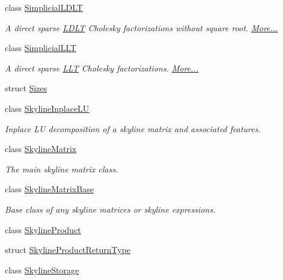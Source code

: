 \begin{DoxyCompactItemize}
class \hyperlink{group___sparse_cholesky___module_class_eigen_1_1_simplicial_l_d_l_t}{Simplicial\+L\+D\+LT}
\begin{DoxyCompactList}\small\item\em A direct sparse \hyperlink{group___cholesky___module_class_eigen_1_1_l_d_l_t}{L\+D\+LT} Cholesky factorizations without square root.  \hyperlink{group___sparse_cholesky___module_class_eigen_1_1_simplicial_l_d_l_t}{More...}\end{DoxyCompactList}\item 
class \hyperlink{group___sparse_cholesky___module_class_eigen_1_1_simplicial_l_l_t}{Simplicial\+L\+LT}
\begin{DoxyCompactList}\small\item\em A direct sparse \hyperlink{group___cholesky___module_class_eigen_1_1_l_l_t}{L\+LT} Cholesky factorizations.  \hyperlink{group___sparse_cholesky___module_class_eigen_1_1_simplicial_l_l_t}{More...}\end{DoxyCompactList}\item 
struct \hyperlink{struct_eigen_1_1_sizes}{Sizes}
\item 
class \hyperlink{class_eigen_1_1_skyline_inplace_l_u}{Skyline\+Inplace\+LU}
\begin{DoxyCompactList}\small\item\em Inplace LU decomposition of a skyline matrix and associated features. \end{DoxyCompactList}\item 
class \hyperlink{class_eigen_1_1_skyline_matrix}{Skyline\+Matrix}
\begin{DoxyCompactList}\small\item\em The main skyline matrix class. \end{DoxyCompactList}\item 
class \hyperlink{class_eigen_1_1_skyline_matrix_base}{Skyline\+Matrix\+Base}
\begin{DoxyCompactList}\small\item\em Base class of any skyline matrices or skyline expressions. \end{DoxyCompactList}\item 
class \hyperlink{class_eigen_1_1_skyline_product}{Skyline\+Product}
\item 
struct \hyperlink{struct_eigen_1_1_skyline_product_return_type}{Skyline\+Product\+Return\+Type}
\item 
class \hyperlink{class_eigen_1_1_skyline_storage}{Skyline\+Storage}
\item 

\end{DoxyCompactItemize}
